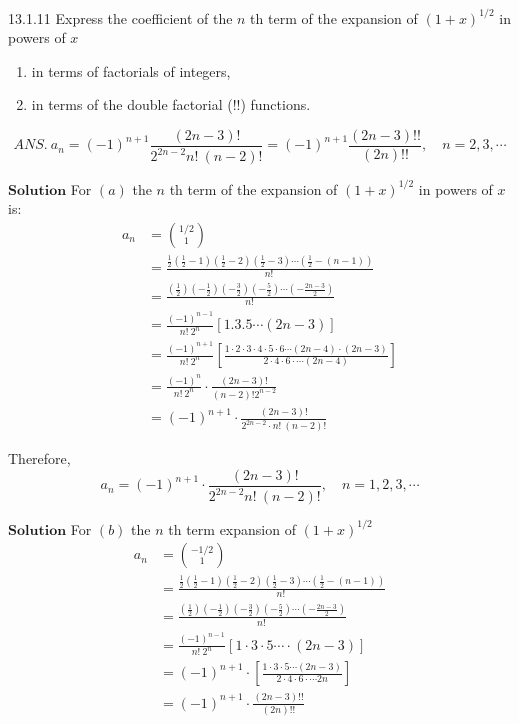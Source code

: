 \newpage

\begin{mybox}{13.1.11}
Express the coefficient of the $n$ th term of the expansion of $(1+x)^{1 / 2}$ in powers of $x$
\begin{enumerate}[$(a)$]
\item in terms of factorials of integers,
\item in terms of the double factorial (!!) functions.
\end{enumerate} 
$$
A N S . \ a_{n}=(-1)^{n+1} \frac{(2 n-3) !}{2^{2 n-2} n! \ (n-2) !}=(-1)^{n+1} \frac{(2 n-3) ! !}{(2 n) ! !},\quad n=2,3,  \cdots
$$
\end{mybox}

$\boxed{\textbf{Solution}}$ For $(a)$ the $n$ th term of the expansion of $(1+x)^{1 / 2}$ in powers of $x$ is:
$$
\begin{aligned}
a_{n} &= \binom{1/2}{1} \\
&=\frac{\frac{1}{2}\left(\frac{1}{2}-1\right)\left(\frac{1}{2}-2\right)\left(\frac{1}{2}-3\right) \cdots\left(\frac{1}{2}-(n-1)\right)}{n! \ } \\
&=\frac{\left(\frac{1}{2}\right)\left(-\frac{1}{2}\right)\left(-\frac{3}{2}\right)\left(-\frac{5}{2}\right) \cdots\left(-\frac{2 n-3}{2}\right)}{n! \ } \\
&=\frac{(-1)^{n-1}}{n! \  2^{n}}[1.3 .5   \cdots (2 n-3)] \\
&=\frac{(-1)^{n+1}}{n! \  2^{n}}\left[\frac{1\cdot 2  \cdot 3  \cdot 4  \cdot 5  \cdot 6  \cdots (2 n-4) \cdot(2 n-3)}{2 \cdot 4  \cdot 6  \cdot   \cdots (2 n-4)}\right] \\
&=\frac{(-1)^{n}}{n! \  2^{n}} \cdot \frac{(2 n-3) !}{(n-2) ! 2^{n-2}} \\
&=(-1)^{n+1} \cdot \frac{(2 n-3) !}{2^{2 n-2} \cdot n! \ (n-2) !} 
\end{aligned}
$$

Therefore, 
$$
a_{n}=(-1)^{n+1} \cdot \frac{(2 n-3) !}{2^{2 n-2} n! \ (n-2) !}, \quad  n=1,2,3, \cdots
$$

$\boxed{\textbf{Solution}}$ For $(b)$ the $n$ th term expansion of $(1+x)^{1 / 2}$ 
$$\begin{aligned}
a_{n} &= \binom{-1/2}{1} \\
&=\frac{\frac{1}{2}\left(\frac{1}{2}-1\right)\left(\frac{1}{2}-2\right)\left(\frac{1}{2}-3\right) \cdots\left(\frac{1}{2}-(n-1)\right)}{n! \ } \\
&=\frac{\left(\frac{1}{2}\right)\left(-\frac{1}{2}\right)\left(-\frac{3}{2}\right)\left(-\frac{5}{2}\right) \cdots\left(-\frac{2 n-3}{2}\right)}{n! \ } \\
&=\frac{(-1)^{n-1}}{n! \  2^{n}}[1 \cdot 3  \cdot 5  \cdots  \cdot(2 n-3)] \\
&=(-1)^{n+1} \cdot\left[\frac{1 \cdot 3  \cdot 5  \cdots (2 n-3)}{2 \cdot 4  \cdot 6 \cdot  \cdots 2 n}\right] \\
&=(-1)^{n+1} \cdot \frac{(2 n-3) ! !}{(2 n) ! !}
\end{aligned}
$$

